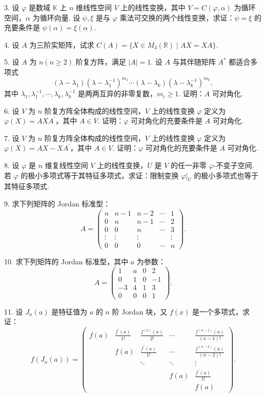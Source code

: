 \documentclass[UTF8,12pt,a4paper,fontset=fandol]{ctexart}
\begin{document}
3. 设 $\varphi$ 是数域 $\mathbb{K}$ 上 $n$ 维线性空间 $V$ 上的线性变换，其中 $V=C(\varphi,\alpha)$ 为循环空间，$\alpha$ 为循环向量. 设 $\psi,\xi$ 是与 $\varphi$ 乘法可交换的两个线性变换，求证：$\psi=\xi$ 的充要条件是 $\psi(\alpha)=\xi(\alpha)$.

4. 设 $A$ 为三阶实矩阵，试求 $C(A)=\{X\in M_3(\mathbb{R})\mid AX=XA\}$.

5. 设 $A$ 为 $n(n\ge2)$ 阶复方阵，满足 $|A|=1$. 设 $A$ 与其伴随矩阵 $A^*$ 都适合多项式
\[
(\lambda-\lambda_1)(\lambda-\lambda_1^{-1})^{m_1}\cdots(\lambda-\lambda_k)(\lambda-\lambda_k^{-1})^{m_k},
\]
其中 $\lambda_1,\lambda_1^{-1},\cdots,\lambda_k,\lambda_k^{-1}$ 是两两互异的非零复数，$m_i\ge1$. 证明：$A$ 可对角化.

6. 设 $V$ 为 $n$ 阶复方阵全体构成的线性空间，$V$ 上的线性变换 $\varphi$ 定义为 $\varphi(X)=AXA^{\prime}$，其中 $A\in V$. 证明：$\varphi$ 可对角化的充要条件是 $A$ 可对角化.

7. 设 $V$ 为 $n$ 阶复方阵全体构成的线性空间，$V$ 上的线性变换 $\varphi$ 定义为 $\varphi(X)=AX-XA^{\prime}$，其中 $A\in V$. 证明：$\varphi$ 可对角化的充要条件是 $A$ 可对角化.

8. 设 $\varphi$ 是 $n$ 维复线性空间 $V$ 上的线性变换，$U$ 是 $V$ 的任一非零 $\varphi$-不变子空间. 若 $\varphi$ 的极小多项式等于其特征多项式，求证：限制变换 $\varphi|_U$ 的极小多项式也等于其特征多项式.

9. 求下列矩阵的 Jordan 标准型：
\[
A=\left(\begin{array}{ccccc}
n&n-1&n-2&\cdots&1\\
0&n&n-1&\cdots&2\\
0&0&n&\cdots&3\\
\vdots&\vdots&\vdots&&\vdots\\
0&0&0&\cdots&n
\end{array}\right).
\]

10. 求下列矩阵的 Jordan 标准型，其中 $a$ 为参数：
\[
A=\left(\begin{array}{rrrr}
1&a&0&2\\
0&1&0&-1\\
-3&4&1&3\\
0&0&0&1
\end{array}\right).
\]

11. 设 $J_n(a)$ 是特征值为 $a$ 的 $n$ 阶 Jordan 块，又 $f(x)$ 是一个多项式，求证：
\[
f(J_n(a))=\left(\begin{array}{ccccc}
f(a)&\frac{f^{\prime}(a)}{1!}&\frac{f^{(2)}(a)}{2!}&\cdots&\frac{f^{(n-1)}(a)}{(n-1)!}\\
&f(a)&\frac{f^{\prime}(a)}{1!}&\cdots&\frac{f^{(n-2)}(a)}{(n-2)!}\\
&&\ddots&\ddots&\vdots\\
&&&f(a)&\frac{f^{\prime}(a)}{1!}\\
&&&&f(a)
\end{array}\right).
\]
\end{document}
